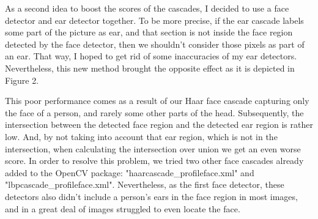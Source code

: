 \documentclass[9pt]{IEEEtran}
\begin{document}
As a second idea to boost the scores of the cascades, I decided to use a face detector and ear detector together. To be more precise, if the ear cascade labels some part of the picture as ear, and that section is not inside the face region detected by the face detector, then we shouldn't consider those pixels as part of an ear. That way, I hoped to get rid of some inaccuracies of my ear detectors. Nevertheless, this new method brought the opposite effect as it is depicted in Figure 2.

This poor performance comes as a result of our Haar face cascade capturing only the face of a person, and rarely some other parts of the head. Subsequently, the intersection between the detected face region and the detected ear region is rather low. And, by not taking into account that ear region, which is not in the intersection, when calculating the intersection over union we get an even worse score. In order to resolve this problem, we tried two other face cascades already added to the OpenCV package: "haarcascade\_profileface.xml" and "lbpcascade\_profileface.xml". Nevertheless, as the first face detector, these detectors also didn't include a person's ears in the face region in most images, and in a great deal of images struggled to even locate the face.
\end{document}
